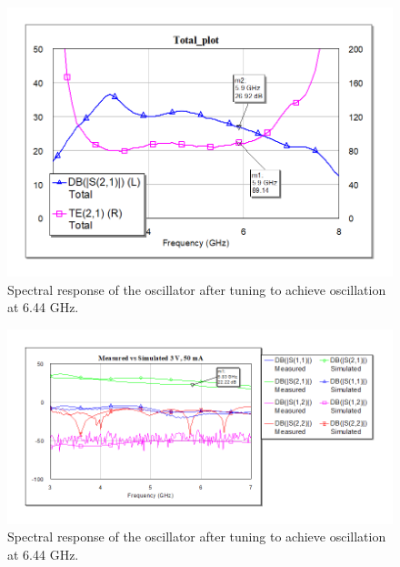 \documentclass[reprint, aps, prl]{revtex4-1}
\begin{document}
\begin{figure}[!htbp]
    \centering
    \includegraphics[scale=0.35]{LNA+PA_Gain+Noise.png}
    \caption{Spectral response of the oscillator after tuning to achieve oscillation at 6.44 GHz.}
    \label{fig:LNAGainNoise}
\end{figure}

\begin{figure}[!htbp]
    \centering
    \includegraphics[scale=0.35]{LNA+PA_Measured.png}
    \caption{Spectral response of the oscillator after tuning to achieve oscillation at 6.44 GHz.}
    \label{fig:LNAPA}
\end{figure}
\end{document}
